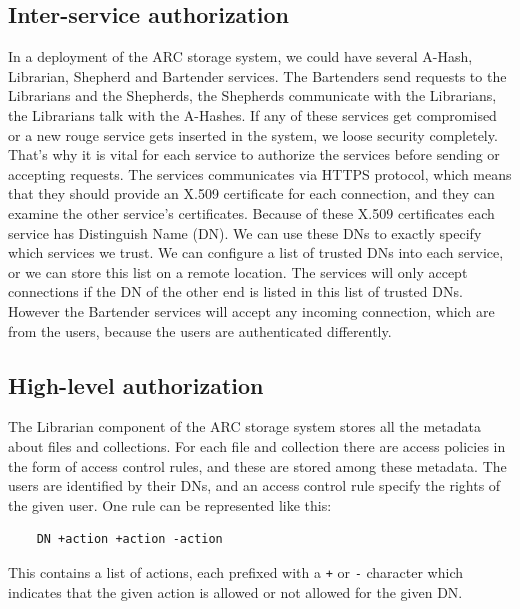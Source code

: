 \documentclass{book}
\begin{document}
\subsection{Inter-service authorization} %
\label{sub:inter_service_authorization}

In a deployment of the ARC storage system, we could have several A-Hash, Librarian, Shepherd and Bartender services. The Bartenders send requests to the Librarians and the Shepherds, the Shepherds communicate with the Librarians, the Librarians talk with the A-Hashes. If any of these services get compromised or a new rouge service gets inserted in the system, we loose security completely. That's why it is vital for each service to authorize the services before sending or accepting requests. The services communicates via HTTPS protocol, which means that they should provide an X.509 certificate for each connection, and they can examine the other service's certificates. Because of these X.509 certificates each service has Distinguish Name (DN). We can use these DNs to exactly specify which services we trust. We can configure a list of trusted DNs into each service, or we can store this list on a remote location. The services will only accept connections if the DN of the other end is listed in this list of trusted DNs. However the Bartender services will accept any incoming connection, which are from the users, because the users are authenticated differently.


\subsection{High-level authorization} %
\label{sub:high_level_authorization}

The Librarian component of the ARC storage system stores all the metadata about files and collections. For each file and collection there are access policies in the form of access control rules, and these are stored among these metadata. The users are identified by their DNs, and an access control rule specify the rights of the given user. One rule can be represented like this:

\begin{verbatim}
    DN +action +action -action
\end{verbatim}

This contains a list of actions, each prefixed with a \verb!+! or \verb!-! character which indicates that the given action is allowed or not allowed for the given DN.
\end{document}
